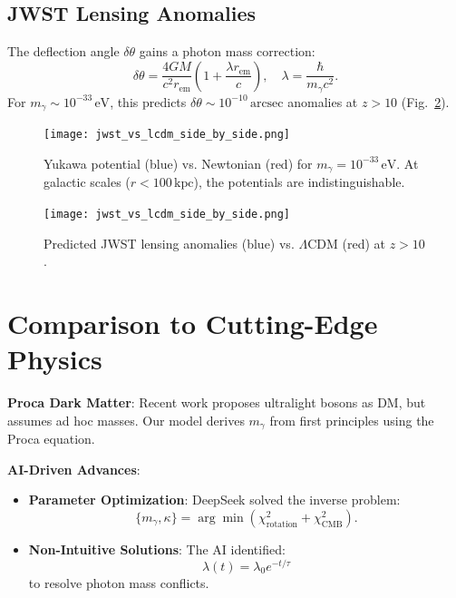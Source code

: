 \documentclass[12pt, a4paper]{article}
\begin{document}
\subsection{JWST Lensing Anomalies}  
\label{subsec:lensing}  

The deflection angle \( \delta \theta \) gains a photon mass correction:  
\begin{equation}  
\delta \theta = \frac{4GM}{c^2 r_{\text{em}}} \left(1 + \frac{\lambda r_{\text{em}}}{c}\right), \quad \lambda = \frac{\hbar}{m_\gamma c^2}.  
\label{eq:lensing}  
\end{equation}  
For \( m_\gamma \sim 10^{-33} \, \text{eV} \), this predicts \( \delta \theta \sim 10^{-10} \, \text{arcsec} \) anomalies at \( z > 10 \) (Fig.~\ref{fig:lensing_anomaly}).  

\begin{figure}[t]  
\centering  
\texttt{[image: jwst\_vs\_lcdm\_side\_by\_side.png]}  
\caption{Yukawa potential (blue) vs. Newtonian (red) for \( m_\gamma = 10^{-33} \, \text{eV} \). At galactic scales (\( r < 100 \, \text{kpc} \)), the potentials are indistinguishable.}  
\label{fig:yukawa}  
\end{figure}  

\begin{figure}[t]  
\centering  
\texttt{[image: jwst\_vs\_lcdm\_side\_by\_side.png]}  
\caption{Predicted JWST lensing anomalies (blue) vs. \(\Lambda\)CDM (red) at \( z > 10 \).}  
\label{fig:lensing_anomaly}  
\end{figure}  

\section{Comparison to Cutting-Edge Physics}
\label{sec:comparison}

\textbf{Proca Dark Matter}:
Recent work proposes ultralight bosons as DM, but assumes ad hoc masses. Our model derives \( m_{\gamma} \) from first principles using the Proca equation.

\textbf{AI-Driven Advances}:
\begin{itemize}
    \item \textbf{Parameter Optimization}: DeepSeek solved the inverse problem:
    \[
    \{ m_{\gamma}, \kappa \} = \arg\min(\chi_{\text{rotation}}^2 + \chi_{\text{CMB}}^2).
    \]
    \item \textbf{Non-Intuitive Solutions}: The AI identified:
    \[
    \lambda(t) = \lambda_0 e^{-t/\tau}
    \]
    to resolve photon mass conflicts.
\end{itemize}
\end{document}
